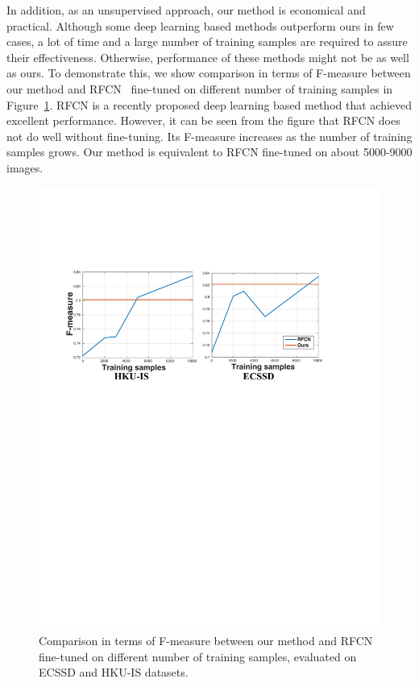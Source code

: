 \documentclass[journal]{IEEEtran}
\begin{document}
In addition, as an unsupervised approach, our method is economical and practical. Although some deep learning based methods outperform ours in few cases, a lot of time and a large number of training samples are required to assure their effectiveness. Otherwise, performance of these methods might not be as well as ours. To demonstrate this, we show comparison in terms of F-measure between our method and RFCN~\cite{Wang2016Saliency} fine-tuned on different number of training samples in Figure~\ref{fig:7}. RFCN is a recently proposed deep learning based method that achieved excellent performance. However, it can be seen from the figure that RFCN does not do well without fine-tuning. Its F-measure increases as the number of training samples grows. Our method is equivalent to RFCN fine-tuned on about 5000-9000 images.
\begin{figure}[t]
\begin{center}
  \includegraphics[width=1\linewidth]{figure7.pdf}
\end{center}
\vspace{-10pt}
  \caption{Comparison in terms of F-measure between our method and RFCN fine-tuned on different number of training samples, evaluated on ECSSD and HKU-IS datasets.}
\label{fig:7}
\end{figure}
\end{document}
